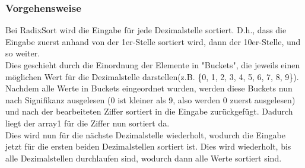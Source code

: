 \documentclass[
../AuD-Zusammenfassung.tex,
]
{subfiles}
\begin{document}
\begin{algorithm}[H]
    
    
        
        
\end{algorithm}

\subsubsection{Vorgehensweise}
Bei RadixSort wird die Eingabe für jede Dezimalstelle sortiert. D.h., dass die Eingabe zuerst anhand von der 1er-Stelle sortiert wird, dann der 10er-Stelle, und so weiter. \\
Dies geschieht durch die Einordnung der Elemente in "Buckets", die jeweils einen möglichen Wert für die Dezimalstelle darstellen(z.B. \{0, 1, 2, 3, 4, 5, 6, 7, 8, 9\}). Nachdem alle Werte in Buckets eingeordnet wurden, werden diese Buckets nun nach Signifikanz ausgelesen (0 ist kleiner als 9, also werden 0 zuerst ausgelesen) und nach der bearbeiteten Ziffer sortiert in die Eingabe zurückgefügt. Dadurch liegt der array1 für die Ziffer nun sortiert da.\\
Dies wird nun für die nächste Dezimalstelle wiederholt, wodurch die Eingabe jetzt für die ersten beiden Dezimalstellen sortiert ist. Dies wird wiederholt, bis alle Dezimalstellen durchlaufen sind, wodurch dann alle Werte sortiert sind.
\newpage
\end{document}
